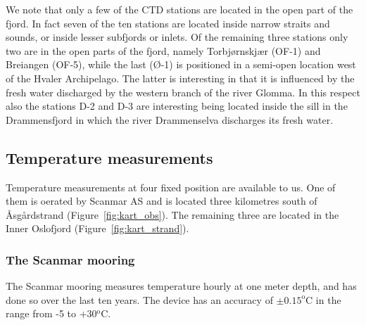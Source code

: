 We note that only a few of the CTD stations are located in the open part of the fjord. In fact seven of the ten stations are located inside narrow straits and sounds, or inside lesser subfjords or inlets. Of the remaining three stations only two are in the open parts of the fjord, namely Torbj{\o}rnskj{\ae}r (OF-1) and Breiangen (OF-5), while the last ({\O}-1) is positioned in a semi-open location west of the Hvaler Archipelago. The latter is interesting in that it is influenced by the fresh water discharged by the western branch of the river Glomma. In this respect also the stations D-2 and D-3 are interesting being located inside the sill in the Drammensfjord in which the river Drammenselva discharges its fresh water.   

\subsection{Temperature measurements}
\label{subsec:tempeo}
Temperature measurements at four fixed position are available to us. One of them is oerated by Scanmar AS and is located three kilometres south of {\AA}sg{\aa}rdstrand (Figure~\ref{fig:kart_obs}). The remaining three are located in the Inner Oslofjord (Figure~\ref{fig:kart_strand}).


\subsubsection{The Scanmar mooring}
The Scanmar mooring measures temperature hourly at one meter depth, and has done so over the last ten years. The device has an accuracy of $\pm 0.15^{\textrm{o}}$C in the range from -5 to +30$^{\textrm{o}}$C. 

